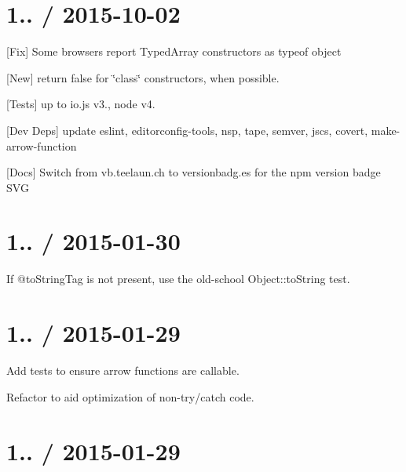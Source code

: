\section*{1.. / 2015-\/10-\/02 }


\begin{DoxyItemize}
\item \mbox{[}Fix\mbox{]} Some browsers report Typed\+Array constructors as {\ttfamily typeof object}
\item \mbox{[}New\mbox{]} return false for \char`\"{}class\char`\"{} constructors, when possible.
\item \mbox{[}Tests\mbox{]} up to {\ttfamily io.\+js} {\ttfamily v3.}, {\ttfamily node} {\ttfamily v4.}
\item \mbox{[}Dev Deps\mbox{]} update {\ttfamily eslint}, {\ttfamily editorconfig-\/tools}, {\ttfamily nsp}, {\ttfamily tape}, {\ttfamily semver}, {\ttfamily jscs}, {\ttfamily covert}, {\ttfamily make-\/arrow-\/function}
\item \mbox{[}Docs\mbox{]} Switch from vb.\+teelaun.\+ch to versionbadg.\+es for the npm version badge S\+VG
\end{DoxyItemize}

\section*{1.. / 2015-\/01-\/30 }


\begin{DoxyItemize}
\item If @to\+String\+Tag is not present, use the old-\/school Object\+::to\+String test.
\end{DoxyItemize}

\section*{1.. / 2015-\/01-\/29 }


\begin{DoxyItemize}
\item Add tests to ensure arrow functions are callable.
\item Refactor to aid optimization of non-\/try/catch code.
\end{DoxyItemize}

\section*{1.. / 2015-\/01-\/29 }


